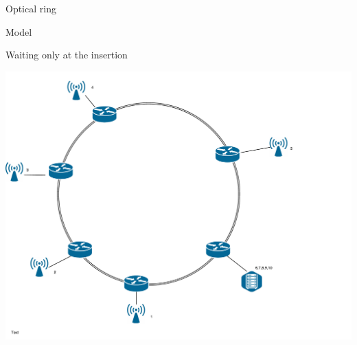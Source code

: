 \documentclass[10 pt]{beamer}
\begin{document}
\begin{frame}{Optical ring}
\begin{block}{Model}
\begin{center}
Waiting only at the insertion
\end{center}
\end{block}

\begin{center}
\includegraphics[scale=0.13]{anneau-simple.pdf}
\end{center}


\end{frame}
\end{document}
